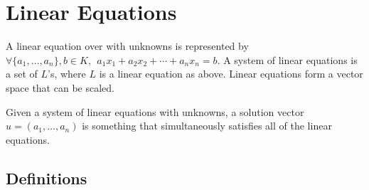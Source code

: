 \section{Linear Equations}

  A linear equation over with unknowns is represented by $\forall \{a_1, \ldots, a_n\}, b \in K,\ \ a_1 x_1 + a_2 x_2 + \cdots + a_n x_n = b$.
  A system of linear equations is a set of $L$'s, where $L$ is a linear equation as above.
  Linear equations form a vector space that can be scaled.
  
  Given a system of linear equations with unknowns, a solution vector $u = (a_1,\ldots, a_n)$ is something that simultaneously satisfies all of the linear equations.
  
  \subsection{Definitions}
  
